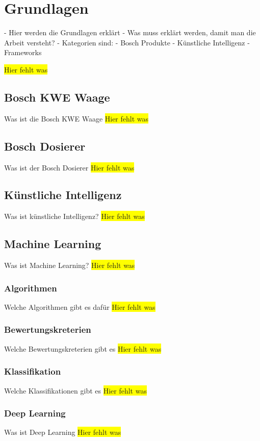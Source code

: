 \chapter{Grundlagen}
\label{ch:grundlagen}
- Hier werden die Grundlagen erklärt
- Was muss erklärt werden, damit man die Arbeit versteht?
- Kategorien sind:
- Bosch Produkte
- Künstliche Intelligenz
- Frameworks

\colorbox{yellow}{Hier fehlt was}

\section{Bosch KWE Waage}
Was ist die Bosch KWE Waage
\colorbox{yellow}{Hier fehlt was}

\section{Bosch Dosierer}
Was ist der Bosch Dosierer
\colorbox{yellow}{Hier fehlt was}

\section{Künstliche Intelligenz}
Was ist künstliche Intelligenz?
\colorbox{yellow}{Hier fehlt was}

\section{Machine Learning}
Was ist Machine Learning?
\colorbox{yellow}{Hier fehlt was}

\subsection{Algorithmen}
Welche Algorithmen gibt es dafür
\colorbox{yellow}{Hier fehlt was}

\subsection{Bewertungskreterien}
Welche Bewertungskreterien gibt es
\colorbox{yellow}{Hier fehlt was}

\subsection{Klassifikation}
Welche Klassifikationen gibt es
\colorbox{yellow}{Hier fehlt was}

\subsection{Deep Learning}
Was ist Deep Learning
\colorbox{yellow}{Hier fehlt was}

